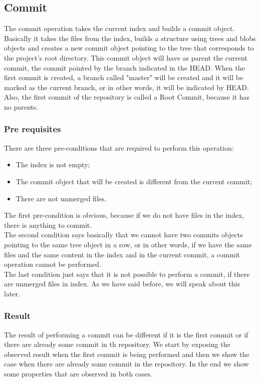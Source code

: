 \subsection{Commit}
The commit operation takes the current index and builds a commit
object. Basically it takes the files from the index, builds a
structure using trees and blobs objects and creates a new commit
object pointing to the tree that corresponds to the project's root
directory. This commit object will have as parent the current commit,
the commit pointed by the branch indicated in the HEAD.
When the first commit is created, a branch called "master" will be created
and it will be marked as the current branch, or in other words, it
will be indicated by HEAD. Also, the first commit of the repository
is called a Root Commit, because it has no parents.

\subsubsection{Pre requisites}
There are three pre-conditions that are required to perform this
operation:
\begin{itemize}
   \item The index is not empty;
   \item The commit object that will be created is different from the
   current commit;
   \item There are not unmerged files.
\end{itemize}
The first pre-condition is obvious, because if we do not have files in
the index, there is anything to commit.\\

The second condition says basically
that we cannot have two commits objects pointing to the same
tree object in a row, or in other words, if we have the same files and
the same content in the index and in the current commit, a commit
operation cannot be performed. \\

The last condition just says that it is not possible to perform a
commit, if there are unmerged files in index. As we have said before,
we will speak about this later.

\subsubsection{Result}
The result of performing a commit can be different if it is the first
commit or if there are already some commit in th repository. 
We start by exposing the observed result when the first commit is
being performed and then we show the case when there are already some
commit in the repository. In the end we show some properties that are
observed in both cases.\\

